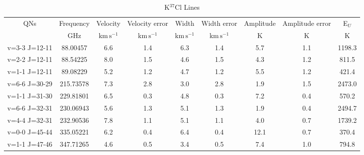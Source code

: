 \begin{table*}[htp]
\centering
\caption{K$^{37}$Cl Lines}
\begin{tabular}{ccccccccc}
\label{tab:K37Cl_salt_lines}
QNs & Frequency & Velocity & Velocity error & Width & Width error & Amplitude & Amplitude error & E$_U$ \\
 & $\mathrm{GHz}$ & $\mathrm{km\,s^{-1}}$ & $\mathrm{km\,s^{-1}}$ & $\mathrm{km\,s^{-1}}$ & $\mathrm{km\,s^{-1}}$ & $\mathrm{K}$ & $\mathrm{K}$ & $\mathrm{K}$ \\
\hline
v=3-3 J=12-11 & 88.00457 & 6.6 & 1.4 & 6.3 & 1.4 & 5.7 & 1.1 & 1198.3 \\
v=2-2 J=12-11 & 88.54225 & 8.0 & 1.5 & 4.6 & 1.5 & 4.3 & 1.2 & 811.5 \\
v=1-1 J=12-11 & 89.08229 & 5.2 & 1.2 & 4.7 & 1.2 & 5.5 & 1.2 & 421.4 \\
v=6-6 J=30-29 & 215.73578 & 7.3 & 2.8 & 3.0 & 2.8 & 1.9 & 1.5 & 2473.0 \\
v=1-1 J=31-30 & 229.81801 & 6.5 & 0.3 & 4.8 & 0.3 & 7.2 & 0.4 & 570.2 \\
v=6-6 J=32-31 & 230.06943 & 5.6 & 1.3 & 5.1 & 1.3 & 1.9 & 0.4 & 2494.7 \\
v=4-4 J=32-31 & 232.90536 & 7.8 & 1.1 & 5.1 & 1.1 & 4.0 & 0.7 & 1739.2 \\
v=0-0 J=45-44 & 335.05221 & 6.2 & 0.4 & 6.4 & 0.4 & 12.1 & 0.7 & 370.4 \\
v=1-1 J=47-46 & 347.71265 & 4.6 & 0.5 & 3.4 & 0.5 & 7.4 & 1.0 & 794.8 \\
\hline
\end{tabular}

\par 
\end{table*}
